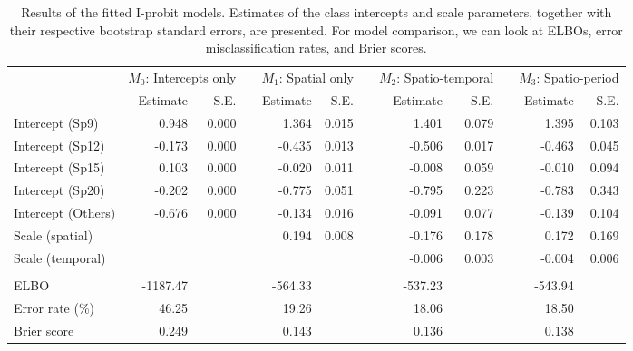 \documentclass[a4paper,showframe,11pt]{report}\usepackage[]{graphicx}\usepackage[]{color}
\begin{document}
\begin{table}
\caption{\label{tab:table.btb}Results of the fitted I-probit models. Estimates of the class intercepts and scale parameters, together with their respective bootstrap standard errors, are presented. For model comparison, we can look at ELBOs, error misclassification rates, and Brier scores.}
\centering
\begin{tabular}[t]{lrrrrrrrrrrr}
\toprule
\multicolumn{1}{c}{ } & \multicolumn{2}{r}{$M_0$: Intercepts only} & \multicolumn{1}{c}{ } & \multicolumn{2}{r}{$M_1$: Spatial only} & \multicolumn{1}{c}{ } & \multicolumn{2}{r}{$M_2$: Spatio-temporal} & \multicolumn{1}{c}{ } & \multicolumn{2}{r}{$M_3$: Spatio-period} \\
\cmidrule(l{2pt}r{2pt}){2-3} \cmidrule(l{2pt}r{2pt}){5-6} \cmidrule(l{2pt}r{2pt}){8-9} \cmidrule(l{2pt}r{2pt}){11-12}
  & Estimate & S.E. &   & Estimate & S.E. &   & Estimate & S.E. &   & Estimate & S.E.\\
\midrule
Intercept (Sp9) & 0.948 & 0.000 &  & 1.364 & 0.015 &  & 1.401 & 0.079 &  & 1.395 & 0.103\\
Intercept (Sp12) & -0.173 & 0.000 &  & -0.435 & 0.013 &  & -0.506 & 0.017 &  & -0.463 & 0.045\\
Intercept (Sp15) & 0.103 & 0.000 &  & -0.020 & 0.011 &  & -0.008 & 0.059 &  & -0.010 & 0.094\\
Intercept (Sp20) & -0.202 & 0.000 &  & -0.775 & 0.051 &  & -0.795 & 0.223 &  & -0.783 & 0.343\\
Intercept (Others) & -0.676 & 0.000 &  & -0.134 & 0.016 &  & -0.091 & 0.077 &  & -0.139 & 0.104\\[0.5em]
Scale (spatial) &  &  &  & 0.194 & 0.008 &  & -0.176 & 0.178 &  & 0.172 & 0.169\\
Scale (temporal) &  &  &  &  &  &  & -0.006 & 0.003 &  & -0.004 & 0.006\\
\\
ELBO & -1187.47 &  &  & -564.33 &  &  & -537.23 &  &  & -543.94 & \\
Error rate (\%) & 46.25 &  &  & 19.26 &  &  & 18.06 &  &  & 18.50 & \\
Brier score & 0.249 &  &  & 0.143 &  &  & 0.136 &  &  & 0.138 & \\
\bottomrule
\end{tabular}
\end{table}
\end{document}
